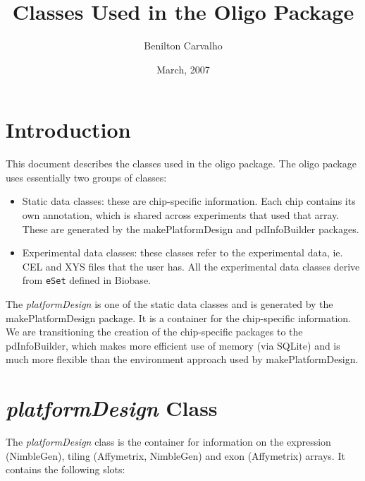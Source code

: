 \documentclass{article}
\newcommand{\Robject}[1]{{\texttt{#1}}}
\newcommand{\Rpackage}[1]{{\textsf{#1}}}
\newcommand{\Rclass}[1]{{\textit{#1}}}
\newcommand{\oligo}{\Rpackage{oligo }}
\begin{document}
\title{Classes Used in the Oligo Package}
\date{March, 2007}
\author{Benilton Carvalho}
\maketitle

\section{Introduction}

This document describes the classes used in the \oligo package. The \oligo package uses essentially two groups of classes:
\begin{itemize}
\item Static data classes: these are chip-specific information. Each chip contains its own annotation, which is shared across experiments that used that array. These are generated by the \Rpackage{makePlatformDesign} and \Rpackage{pdInfoBuilder} packages.
\item Experimental data classes: these classes refer to the experimental data, ie. CEL and XYS files that the user has. All the experimental data classes derive from \Robject{eSet} defined in \Rpackage{Biobase}.
\end{itemize}

The \Rclass{platformDesign} is one of the static data classes and is generated by the \Rpackage{makePlatformDesign} package. It is a container for the chip-specific information. We are transitioning the creation of the chip-specific packages to the \Rpackage{pdInfoBuilder}, which makes more efficient use of memory (via SQLite) and is much more flexible than the environment approach used by \Rpackage{makePlatformDesign}.

\section{\Rclass{platformDesign} Class}

The \Rclass{platformDesign} class is the container for information on
the expression (NimbleGen), tiling (Affymetrix, NimbleGen) and exon
(Affymetrix) arrays. It contains the following slots:
\end{document}
